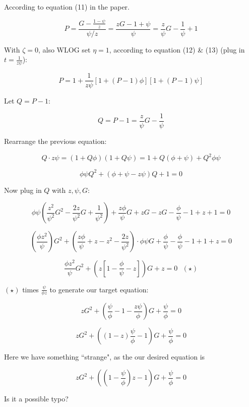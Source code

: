 \documentclass[a4paper]{article}
\date{\today}
\begin{document}
According to equation (11) in the paper.

		$$P=\frac{G-\frac{1-\psi}{z}}{\psi/z}=\frac{zG-1+\psi}{\psi}=\frac{z}{\psi}G-\frac{1}{\psi}+1$$

With $\zeta=0$, also WLOG set $\eta=1$, according to equation (12) \& (13) (plug in $t=\frac{1}{z\psi}$):

$$P=1+\frac{1}{z\psi}[1+(P-1)\phi][1+(P-1)\psi]$$

Let $Q=P-1:$

$$Q=P-1 =\frac{z}{\psi} G -\frac{1}{\psi}$$

Rearrange the previous equation:

$$Q\cdot z\psi = (1+Q\phi)(1+Q\psi)=1+Q(\phi+\psi)+Q^2\phi\psi$$

$$\phi\psi Q^2+(\phi+\psi-z\psi)Q+1=0$$

Now plug in $Q$ with $z,\psi,G$:

$$\phi\psi\left(\frac{z^2}{\psi^2}G^2-\frac{2z}{\psi^2}G+\frac1{\psi^2}\right)+\frac{z\phi}{\psi}G+zG-zG-\frac{\phi}{\psi}-1+z+1=0$$

$$\left(\frac{\phi z^2}{\psi}\right)G^2+\left(\frac{z\phi}{\psi}+z-z^2-\frac{2z}{\psi^2}\right)\cdot\phi\psi G+\frac{\phi}{\psi}-\frac{\phi}{\psi}-1+1+z=0$$

$$\frac{\phi z^2}{\psi}G^2+\left(z[1-\frac{\phi}{\psi}-z]\right)G+z=0\ \ \ (\star)$$

$(\star)$ times $\frac{\psi}{\phi z}$ to generate our target equation:

$$zG^2+\left(\frac{\psi}{\phi}-1-\frac{z\psi}{\phi}\right)G+\frac{\psi}{\phi} = 0$$

$$zG^2+\left((1-z)\frac{\psi}{\phi}-1\right)G+\frac{\psi}{\phi} = 0$$

Here we have something ``strange", as the our desired equation is

$$zG^2+\left((1-\frac{\psi}{\phi})z-1\right)G+\frac{\psi}{\phi}=0$$

Is it a possible typo?
\end{document}
